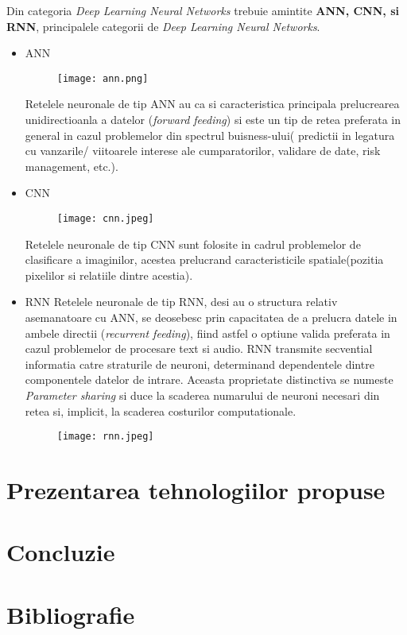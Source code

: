 \documentclass[a4paper]{article}
\begin{document}
Din categoria \textit{Deep Learning Neural
Networks} trebuie amintite \textbf{ANN, CNN, si RNN}, principalele categorii de \textit{Deep Learning Neural Networks}.
\begin{itemize}


	\item ANN

\begin{figure}[ht]
	\centering
	\texttt{[image: ann.png]}
\label{ANN}
\end{figure}
Retelele neuronale de tip ANN au ca si caracteristica principala prelucrearea unidirectioanla a datelor (\textit{forward feeding})
si este un tip de retea preferata in general in cazul problemelor din spectrul buisness-ului( predictii in legatura cu vanzarile/
viitoarele interese ale cumparatorilor, validare de date, risk management, etc.).

	\item CNN
\begin{figure}[ht]
	\centering
	\texttt{[image: cnn.jpeg]}
\label{CNN}
\end{figure}


Retelele neuronale de tip CNN sunt folosite in cadrul problemelor de clasificare a imaginilor, acestea prelucrand caracteristicile
spatiale(pozitia pixelilor si relatiile dintre acestia).

	\item RNN
Retelele neuronale de tip RNN, desi au o structura relativ asemanatoare cu ANN, se deosebesc prin capacitatea de a prelucra datele
in ambele directii (\textit{recurrent feeding}), fiind astfel o optiune valida preferata in cazul problemelor de procesare text
si audio. RNN transmite secvential informatia catre straturile de neuroni, determinand dependentele dintre componentele datelor
de intrare. Aceasta proprietate distinctiva se numeste \textit{Parameter sharing} si duce la scaderea numarului de neuroni necesari
din retea si, implicit, la scaderea costurilor computationale.
\begin{figure}[ht]
	\centering
	\texttt{[image: rnn.jpeg]}
\label{RNN}

\end{figure}

\end{itemize}


 \section {Prezentarea tehnologiilor propuse}

\section{Concluzie}

\section{Bibliografie}
\end{document}
